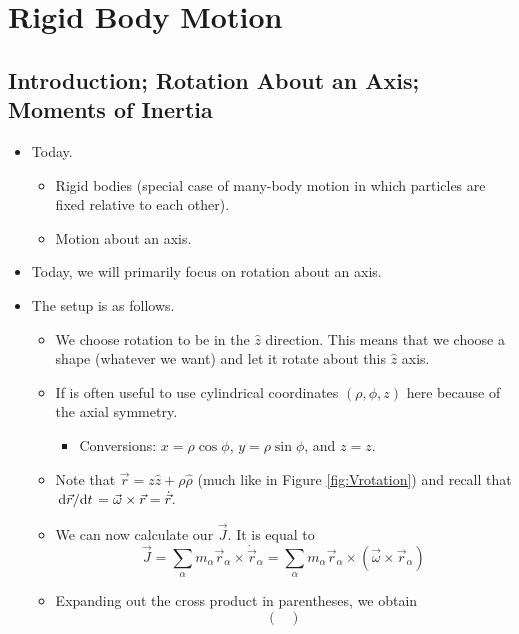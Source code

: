 \documentclass[../notes.tex]{subfiles}
\begin{document}
\chapter{Rigid Body Motion}
\section{Introduction; Rotation About an Axis; Moments of Inertia}
\begin{itemize}
    \item {}Today.
    \begin{itemize}
        \item Rigid bodies (special case of many-body motion in which particles are fixed relative to each other).
        \item Motion about an axis.
    \end{itemize}
    \item Today, we will primarily focus on rotation about an axis.
    \item The setup is as follows.
    \begin{itemize}
        \item We choose rotation to be in the $\hat{z}$ direction. This means that we choose a shape (whatever we want) and let it rotate about this $\hat{z}$ axis.
        \item If is often useful to use cylindrical coordinates $(\rho,\phi,z)$ here because of the axial symmetry.
        \begin{itemize}
            \item Conversions: $x=\rho\cos\phi$, $y=\rho\sin\phi$, and $z=z$.
        \end{itemize}
        \item Note that $\vec{r}=z\hat{z}+\rho\hat{\rho}$ (much like in Figure \ref{fig:Vrotation}) and recall that $\dv*{\vec{r}}{t}=\vec{\omega}\times\vec{r}=\dot{\vec{r}}$.
        \item We can now calculate our $\vec{J}$. It is equal to
        \begin{equation*}
            \vec{J} = \sum_\alpha m_\alpha\vec{r}_\alpha\times\dot{\vec{r}}_\alpha
            = \sum_\alpha m_\alpha\vec{r}_\alpha\times(\vec{\omega}\times\vec{r}_\alpha)
        \end{equation*}
        \item Expanding out the cross product in parentheses, we obtain
        \begin{equation*}
            \begin{pmatrix}

\end{pmatrix}
\end{equation*}
\end{itemize}
\end{itemize}
\end{document}
